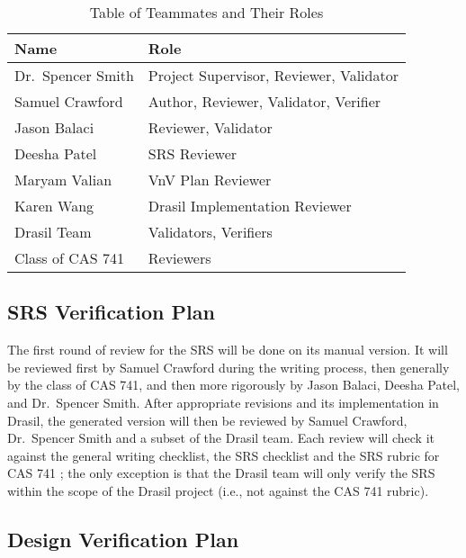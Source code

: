 \documentclass[12pt, titlepage]{article}
\begin{document}
\begin{table}[h!]
  \centering
  \begin{tabular}{| l | l |}
    \hline
    \rowcolor[gray]{0.9}
    \bf Name          & \bf Role                                \\
    \hline
    Dr.~Spencer Smith & Project Supervisor, Reviewer, Validator \\
    \hline
    Samuel Crawford   & Author, Reviewer, Validator, Verifier   \\
    \hline
    Jason Balaci      & Reviewer, Validator                     \\
    \hline
    Deesha Patel      & SRS Reviewer                            \\
    \hline
    Maryam Valian     & VnV Plan Reviewer                       \\
    \hline
    Karen Wang        & Drasil Implementation Reviewer          \\
    \hline
    Drasil Team       & Validators, Verifiers                   \\
    \hline
    Class of CAS 741  & Reviewers                               \\
    \hline
  \end{tabular}
  \caption{Table of Teammates and Their Roles}
  \label{table_team}
\end{table}

\subsection{SRS Verification Plan}

The first round of review for the SRS will be done on its manual version.
It will be reviewed first by Samuel Crawford during the writing process, then
generally by the class of CAS 741, and then more rigorously by Jason Balaci,
Deesha Patel, and Dr.~Spencer Smith. After appropriate revisions and its
implementation in Drasil, the generated version will then be reviewed by Samuel
Crawford, Dr.~Spencer Smith and a subset of the Drasil team. Each review will
check it against the general writing checklist, the SRS checklist and the SRS
rubric for CAS 741 ; the only exception is that the Drasil team
will only verify the SRS
within the scope of the Drasil project (i.e., not against the CAS 741 rubric).

\subsection{Design Verification Plan}
\end{document}

